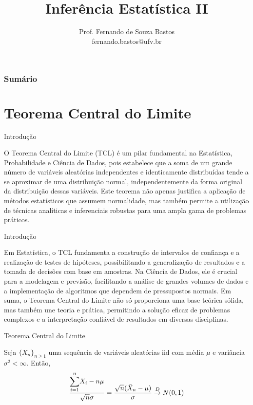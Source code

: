 \documentclass[12pt]{beamer}
\title{Inferência Estatística II}
\author{Prof. Fernando de Souza Bastos\texorpdfstring{\\ fernando.bastos@ufv.br}{}}
\institute{Departamento de Estatística\texorpdfstring{\\ Programa de Pós-Graduação em Estatística Aplicada e Biometria}\texorpdfstring{\\ Universidade Federal de Viçosa}{}\texorpdfstring{\\ Campus UFV - Viçosa}{}}
\date{}
\begin{document}

\frame{\titlepage}

\begin{frame}{}
\frametitle{\bf Sumário}
\tableofcontents
\end{frame}

\section{Teorema Central do Limite}
\begin{frame}{Introdução}
	\begin{block}{}
		\justifying
O Teorema Central do Limite (TCL) é um pilar fundamental na Estatística, Probabilidade e Ciência de Dados, pois estabelece que a soma de um grande número de variáveis aleatórias independentes e identicamente distribuídas tende a se aproximar de uma distribuição normal, independentemente da forma original da distribuição dessas variáveis. Este teorema não apenas justifica a aplicação de métodos estatísticos que assumem normalidade, mas também permite a utilização de técnicas analíticas e inferenciais robustas para uma ampla gama de problemas práticos. 		
	\end{block}
\end{frame}

\begin{frame}{Introdução}
	\begin{block}{}
		\justifying
Em Estatística, o TCL fundamenta a construção de intervalos de confiança e a realização de testes de hipóteses, possibilitando a generalização de resultados e a tomada de decisões com base em amostras. Na Ciência de Dados, ele é crucial para a modelagem e previsão, facilitando a análise de grandes volumes de dados e a implementação de algoritmos que dependem de pressupostos normais. Em suma, o Teorema Central do Limite não só proporciona uma base teórica sólida, mas também une teoria e prática, permitindo a solução eficaz de problemas complexos e a interpretação confiável de resultados em diversas disciplinas.		
	\end{block}
\end{frame}

\begin{frame}{Teorema Central do Limite}
\begin{block}{}
\justifying
Seja $\{X_{n}\}_{n\geq 1}$ uma sequência de variáveis aleatórias iid com média $\mu$ e variância $\sigma^{2}<\infty.$ Então,
\begin{align*}
   \dfrac{{\displaystyle \sum_{i=1}^{n}} X_{i}-n\mu}{\sqrt{n}\sigma}=\dfrac{\sqrt{n}(\Bar{X}_{n}-\mu)}{\sigma} \overset{D}{\rightarrow} N(0,1)
\end{align*}
\end{block}
\end{frame}
\end{document}
